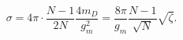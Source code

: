 \begin{equation}
\label{Sig}
\sigma=4\pi\cdot\frac{N-1}{2N}\frac{4m_D}{g_m^2}=
\frac{8\pi}{g_m}\frac{N-1}{\sqrt{N}}\sqrt{\zeta}.
\end{equation}

